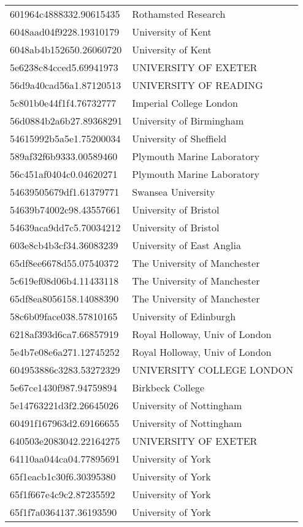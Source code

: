 \begin{tabular}{ll}
601964c4888332.90615435 & Rothamsted Research \\
6048aad04f9228.19310179 & University of Kent \\
6048ab4b152650.26060720 & University of Kent \\
5e6238c84cced5.69941973 & UNIVERSITY OF EXETER \\
56d9a40cad56a1.87120513 & UNIVERSITY OF READING \\
5c801b0e44f1f4.76732777 & Imperial College London \\
56d0884b2a6b27.89368291 & University of Birmingham \\
54615992b5a5e1.75200034 & University of Sheffield \\
589af32f6b9333.00589460 & Plymouth Marine Laboratory \\
56c451af0404c0.04620271 & Plymouth Marine Laboratory \\
54639505679df1.61379771 & Swansea University \\
54639b74002c98.43557661 & University of Bristol \\
54639aca9dd7c5.70034212 & University of Bristol \\
603e8cb4b3cf34.36083239 & University of East Anglia \\
65df8ee6678d55.07540372 & The University of Manchester \\
5c619ef08d06b4.11433118 & The University of Manchester \\
65df8ea8056158.14088390 & The University of Manchester \\
58c6b09face038.57810165 & University of Edinburgh \\
6218af393d6ca7.66857919 & Royal Holloway, Univ of London \\
5e4b7e08e6a271.12745252 & Royal Holloway, Univ of London \\
604953886c3283.53272329 & UNIVERSITY COLLEGE LONDON \\
5e67ce1430f987.94759894 & Birkbeck College \\
5e14763221d3f2.26645026 & University of Nottingham \\
60491f167963d2.69166655 & University of Nottingham \\
640503e2083042.22164275 & UNIVERSITY OF EXETER \\
64110aa044ca04.77895691 & University of York \\
65f1eacb1c30f6.30395380 & University of York \\
65f1f667e4c9c2.87235592 & University of York \\
65f1f7a0364137.36193590 & University of York \\

\end{tabular}
